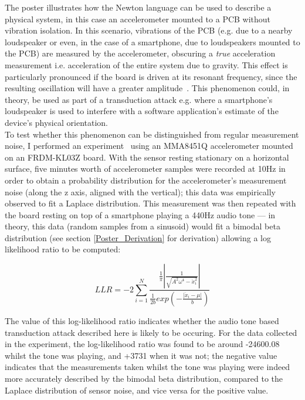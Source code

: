 \documentclass[12pt]{article}
\begin{document}
\begin{appendix}
      The poster illustrates how the Newton language can be used to describe a physical system, in this case an accelerometer mounted to a PCB without vibration isolation. In this scenario, vibrations of the PCB (e.g. due to a nearby loudspeaker or even, in the case of a smartphone, due to loudspeakers mounted to the PCB) are measured by the accelerometer, obscuring a \textit{true} acceleration measurement i.e. acceleration of the entire system due to gravity. This effect is particularly pronounced if the board is driven at its resonant frequency, since the resulting oscillation will have a greater amplitude~\cite{adi}. This phenomenon could, in theory, be used as part of a transduction attack e.g. where a smartphone's loudspeaker is used to interfere with a software application's estimate of the device's physical orientation.\\

      To test whether this phenomenon can be distinguished from regular measurement noise, I performed an experiment~\cite{poster_experiment} using an MMA8451Q accelerometer mounted on an FRDM-KL03Z board. With the sensor resting stationary on a horizontal surface, five minutes worth of accelerometer samples were recorded at 10Hz in order to obtain a probability distribution for the accelerometer's measurement noise (along the z axis, aligned with the vertical); this data was empirically observed to fit a Laplace distribution. This measurement was then repeated with the board resting on top of a smartphone playing a 440Hz audio tone --- in theory, this data (random samples from a sinusoid) would fit a bimodal beta distribution (see section \ref{Poster_Derivation} for derivation) allowing a log likelihood ratio to be computed:

      \begin{equation}
        LLR = -2 \sum_{i = 1}^{N} \frac{\frac{1}{\pi}\left| \frac{1}{\sqrt{A^2\omega^4 - \ddot{x}_i^2}} \right|}{\frac{1}{2b} exp\left(-\frac{|\ddot{x}_i-\mu|}{b}\right)}
      \end{equation}

      The value of this log-likelihood ratio indicates whether the audio tone based transduction attack described here is likely to be occuring. For the data collected in the experiment, the log-likelihood ratio was found to be around -24600.08 whilst the tone was playing, and +3731 when it was not; the negative value indicates that the measurements taken whilst the tone was playing were indeed more accurately described by the bimodal beta distribution, compared to the Laplace distribution of sensor noise, and vice versa for the positive value.


\end{appendix}
\end{document}
